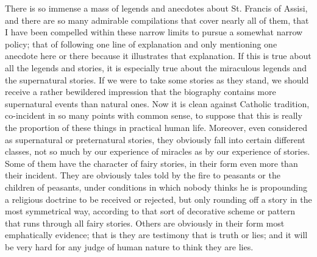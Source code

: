 \documentclass{book}
\begin{document}
There is so immense a mass of legends and anecdotes about St. Francis of Assisi, and there are so many admirable compilations that cover nearly all of them, that I have been compelled within these narrow limits to pursue a somewhat narrow policy; that of following one line of explanation and only mentioning one anecdote here or there because it illustrates that explanation. If this is true about all the legends and stories, it is especially true about the miraculous legends and the supernatural stories. If we were to take some stories as they stand, we should receive a rather bewildered impression that the biography contains more supernatural events than natural ones. Now it is clean against Catholic tradition, co-incident in so many points with common sense, to suppose that this is really the proportion of these things in practical human life. Moreover, even considered as supernatural or preternatural stories, they obviously fall into certain different classes, not so much by our experience of miracles as by our experience of stories. Some of them have the character of fairy stories, in their form even more than their incident. They are obviously tales told by the fire to peasants or the children of peasants, under conditions in which nobody thinks he is propounding a religious doctrine to be received or rejected, but only rounding off a story in the most symmetrical way, according to that sort of decorative scheme or pattern that runs through all fairy stories. Others are obviously in their form most emphatically evidence; that is they are testimony that is truth or lies; and it will be very hard for any judge of human nature to think they are lies.
\end{document}
